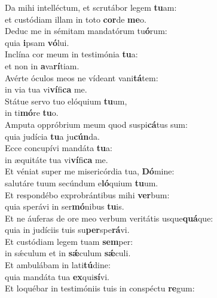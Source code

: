 \evenverse Da mihi intelléctum, et scrutábor legem \textbf{tu}am:~\*\\
\evenverse et custódiam illam in toto \textbf{cor}de \textbf{me}o.\\
\oddverse Deduc me in sémitam mandatórum tu\textbf{ó}rum:~\*\\
\oddverse quia \textbf{i}psam \textbf{vó}lui.\\
\evenverse Inclína cor meum in testimónia \textbf{tu}a:~\*\\
\evenverse et non in \textbf{a}va\textbf{rí}tiam.\\
\oddverse Avérte óculos meos ne vídeant vani\textbf{tá}tem:~\*\\
\oddverse in via tua vi\textbf{ví}fi\textbf{ca} me.\\
\evenverse Státue servo tuo elóquium \textbf{tu}um,~\*\\
\evenverse in ti\textbf{mó}re \textbf{tu}o.\\
\oddverse Amputa oppróbrium meum quod suspi\textbf{cá}tus sum:~\*\\
\oddverse quia judícia \textbf{tu}a ju\textbf{cún}da.\\
\evenverse Ecce concupívi mandáta \textbf{tu}a:~\*\\
\evenverse in æquitáte tua vi\textbf{ví}fi\textbf{ca} me.\\
\oddverse Et véniat super me misericórdia tua, \textbf{Dó}mine:~\*\\
\oddverse salutáre tuum secúndum e\textbf{ló}quium \textbf{tu}um.\\
\evenverse Et respondébo exprobrántibus mihi \textbf{ver}bum:~\*\\
\evenverse quia sperávi in ser\textbf{mó}nibus \textbf{tu}is.\\
\oddverse Et ne áuferas de ore meo verbum veritátis usque\textbf{quá}que:~\*\\
\oddverse quia in judíciis tuis su\textbf{per}spe\textbf{rá}vi.\\
\evenverse Et custódiam legem tuam \textbf{sem}per:~\*\\
\evenverse in sǽculum et in \textbf{sǽ}culum \textbf{sǽ}culi.\\
\oddverse Et ambulábam in lati\textbf{tú}dine:~\*\\
\oddverse quia mandáta tua \textbf{ex}qui\textbf{sí}vi.\\
\evenverse Et loquébar in testimóniis tuis in conspéctu \textbf{re}gum:~\*\\
